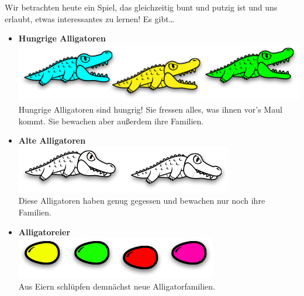 \documentclass{beamer}
\begin{document}
\begin{frame}
Wir betrachten heute ein Spiel, das gleichzeitig bunt und putzig ist und uns erlaubt,
etwas interessantes zu lernen! Es gibt\dots \pause\smallskip

\begin{itemize}
\item \textbf{Hungrige Alligatoren}\\
      \includegraphics[scale=0.2]{pieces_1.png}\\
      Hungrige Alligatoren sind hungrig! Sie fressen alles, was ihnen vor's Maul kommt.
      Sie bewachen aber außerdem ihre Familien.
      \pause
\item \textbf{Alte Alligatoren}\\
      \includegraphics[scale=0.2]{pieces_2.png}\\
      Diese Alligatoren haben genug gegessen und bewachen nur noch ihre Familien.
      \pause
\item \textbf{Alligatoreier}\\
      \includegraphics[scale=0.2]{pieces_3.png}\\
      Aus Eiern schlüpfen demnächst neue Alligatorfamilien.
\end{itemize}

\end{frame}

\end{document}
